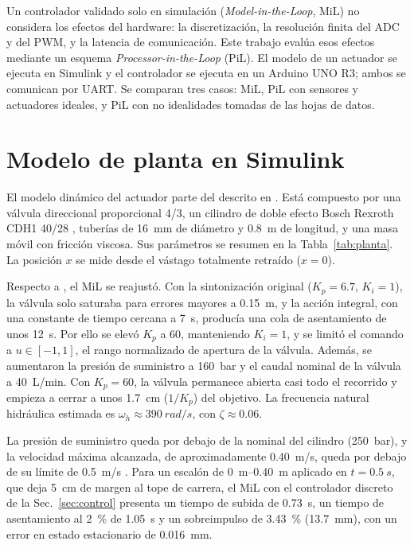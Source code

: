\documentclass[conference]{IEEEtran}
\begin{document}
Un controlador validado solo en simulación (\textit{Model-in-the-Loop}, MiL) no considera los efectos del hardware: la discretización, la resolución finita del ADC y del PWM, y la latencia de comunicación. Este trabajo evalúa esos efectos mediante un esquema \textit{Processor-in-the-Loop} (PiL). El modelo de un actuador se ejecuta en Simulink y el controlador se ejecuta en un Arduino UNO R3; ambos se comunican por UART. Se comparan tres casos: MiL, PiL con sensores y actuadores ideales, y PiL con no idealidades tomadas de las hojas de datos.
\section{Modelo de planta en Simulink}
\label{sec:planta}

El modelo dinámico del actuador parte del descrito en \cite{avance2}. Está compuesto por una válvula direccional proporcional 4/3, un cilindro de doble efecto Bosch Rexroth CDH1 40/28 \cite{rexroth}, tuberías de \SI{16}{mm} de diámetro y \SI{0.8}{m} de longitud, y una masa móvil con fricción viscosa. Sus parámetros se resumen en la Tabla~\ref{tab:planta}. La posición $x$ se mide desde el vástago totalmente retraído ($x=0$).

Respecto a \cite{avance2}, el MiL se reajustó. Con la sintonización original ($K_p=6.7$, $K_i=1$), la válvula solo saturaba para errores mayores a \SI{0.15}{m}, y la acción integral, con una constante de tiempo cercana a \SI{7}{s}, producía una cola de asentamiento de unos \SI{12}{s}. Por ello se elevó $K_p$ a 60, manteniendo $K_i=1$, y se limitó el comando a $u\in[-1,1]$, el rango normalizado de apertura de la válvula. Además, se aumentaron la presión de suministro a \SI{160}{bar} y el caudal nominal de la válvula a \SI{40}{L/min}. Con $K_p=60$, la válvula permanece abierta casi todo el recorrido y empieza a cerrar a unos \SI{1.7}{cm} ($1/K_p$) del objetivo. La frecuencia natural hidráulica estimada es $\omega_h\approx\SI{390}{rad/s}$, con $\zeta\approx0.06$.

La presión de suministro queda por debajo de la nominal del cilindro (\SI{250}{bar}), y la velocidad máxima alcanzada, de aproximadamente \SI{0.40}{m/s}, queda por debajo de su límite de \SI{0.5}{m/s} \cite{rexroth}. Para un escalón de \SIrange{0}{0.40}{m} aplicado en $t=\SI{0.5}{s}$, que deja \SI{5}{cm} de margen al tope de carrera, el MiL con el controlador discreto de la Sec.~\ref{sec:control} presenta un tiempo de subida de \SI{0.73}{s}, un tiempo de asentamiento al \SI{2}{\percent} de \SI{1.05}{s} y un sobreimpulso de \SI{3.43}{\percent} (\SI{13.7}{mm}), con un error en estado estacionario de \SI{0.016}{mm}.
\end{document}
